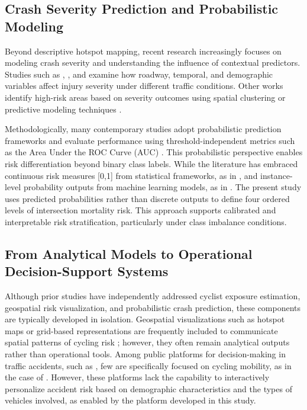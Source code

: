 \documentclass[preprint,12pt]{elsarticle}
\begin{document}
\subsection{Crash Severity Prediction and Probabilistic Modeling}

Beyond descriptive hotspot mapping, recent research increasingly focuses on modeling crash severity and understanding the influence of contextual predictors. Studies such as \cite{schroter_determinants_2023}, \cite{liu_mixed_2022}, and \cite{scarano_injury_2023} examine how roadway, temporal, and demographic variables affect injury severity under different traffic conditions. Other works identify high-risk areas based on severity outcomes using spatial clustering or predictive modeling techniques \cite{jaber_towards_2023,prencipe_injury_2025}.

Methodologically, many contemporary studies adopt probabilistic prediction frameworks and evaluate performance using threshold-independent metrics such as the Area Under the ROC Curve (AUC) \cite{ali_advances_2024}. This probabilistic perspective enables risk differentiation beyond binary class labels. While the literature has embraced continuous risk measures [0,1] from statistical frameworks, as in \cite{paul_critical_2025}, and instance-level probability outputs from machine learning models, as in \cite{zhu_crash_2021,agheli_how_2025}.  The present study uses predicted probabilities rather than discrete outputs to define four ordered levels of intersection mortality risk. This approach supports calibrated and interpretable risk stratification, particularly under class imbalance conditions.

\subsection{From Analytical Models to Operational Decision-Support Systems}

Although prior studies have independently addressed cyclist exposure estimation, geospatial risk visualization, and probabilistic crash prediction, these components are typically developed in isolation. Geospatial visualizations such as hotspot maps or grid-based representations are frequently included to communicate spatial patterns of cycling risk \cite{ferster_mapping_2021,jaber_towards_2023,prencipe_injury_2025,feizizadeh_gis_2025}; however, they often remain analytical outputs rather than operational tools. Among public platforms for decision-making in traffic accidents, such as \cite{gupta_development_2023}, few are specifically focused on cycling mobility, as in the case of \cite{francePlatform_new_2026}. However, these platforms lack the capability to interactively personalize accident risk based on demographic characteristics and the types of vehicles involved, as enabled by the platform developed in this study.
\end{document}
